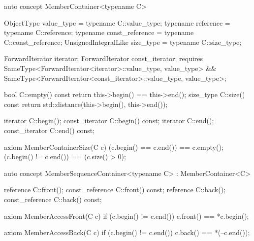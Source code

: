 \documentclass[american,twoside]{book}
\begin{document}
\color{addclr}
\begin{itemdecl}
auto concept MemberContainer<typename C> {
  ObjectType           value_type      = typename C::value_type;
  typename             reference       = typename C::reference;
  typename             const_reference = typename C::const_reference;
  UnsignedIntegralLike size_type       = typename C::size_type;

  ForwardIterator iterator;
  ForwardIterator const_iterator;
  requires SameType<ForwardIterator<iterator>::value_type, value_type> 
           && SameType<ForwardIterator<const_iterator>::value_type, value_type>;

  bool           C::empty() const { return  this->begin() == this->end(); }
  size_type      C::size() const  { return std::distance(this->begin(), this->end()); }

  iterator       C::begin();
  const_iterator C::begin() const;
  iterator       C::end();
  const_iterator C::end() const;

  axiom MemberContainerSize(C c) {
    (c.begin() == c.end()) == c.empty();
    (c.begin() != c.end()) == (c.size() > 0);
  }
}
\end{itemdecl}

\begin{itemdescr}
\pnum
{}
\pnum
\addedConcepts{\mbox{\requires} for a (possibly
  \mbox{\tcode{const}}-qualified) container \mbox{\tcode{c}},
  \mbox{\tcode{[c.begin(), c.end())}} is a valid range.}
\end{itemdescr}

\begin{itemdecl}
auto concept MemberSequenceContainer<typename C> : MemberContainer<C> {
  reference       C::front();
  const_reference C::front() const;
  reference       C::back();
  const_reference C::back() const;

  axiom MemberAccessFront(C c) {
    if (c.begin() != c.end()) c.front() == *c.begin();
  }  

  axiom MemberAccessBack(C c) {
    if (c.begin() != c.end()) c.back() == *(--c.end());
  }
}
\end{itemdecl}


\begin{itemdescr}
\pnum 
{}
\end{itemdescr}
\end{document}
